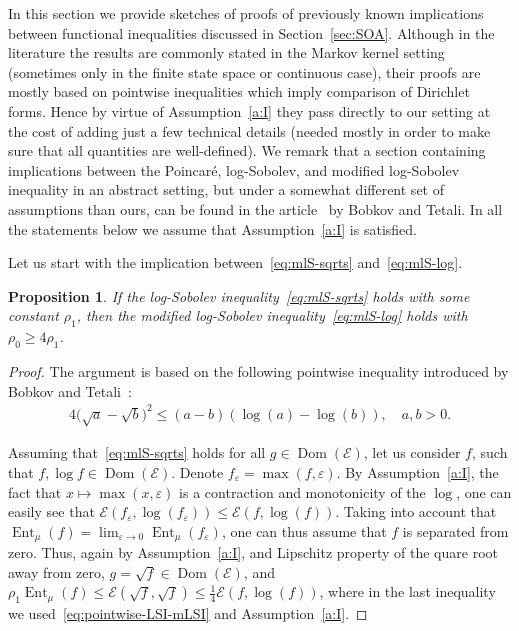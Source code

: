 \documentclass[a4paper]{amsart}
\newtheorem{proposition}[theorem]{Proposition} %
\theoremstyle{definition}
\theoremstyle{remark}
\numberwithin{equation}{section}
\DeclareMathOperator{\Dom}{Dom} %
\newcommand*{\calE}{\mathcal{E}}
\DeclareMathOperator{\Ent}{Ent}	%
\begin{document}
In this section we provide sketches of proofs of previously known implications between functional inequalities discussed in Section~\ref{sec:SOA}. Although in the literature the results are commonly stated in the Markov kernel setting (sometimes only in the finite state space or continuous case), their proofs are mostly based on pointwise inequalities which imply comparison of Dirichlet forms. Hence by virtue of Assumption~\ref{a:I} they pass directly to our setting at the cost of adding just a few technical details (needed mostly in order to make sure that all quantities are well-defined). We remark that a section containing implications between the Poincar\'e, log-Sobolev, and modified log-Sobolev inequality in an abstract setting, but under a somewhat different set of assumptions than ours, can be found in the article~\cite{MR2283379} by Bobkov and Tetali. In all the statements below we assume that Assumption~\ref{a:I} is satisfied.

Let us start with the implication between~\eqref{eq:mlS-sqrts} and~\eqref{eq:mlS-log}.
\begin{proposition}
\label{prop:LSI-to-mLSI}
If the log-Sobolev inequality~\eqref{eq:mlS-sqrts} holds with some constant $\rho_1$, then the modified log-Sobolev inequality~\eqref{eq:mlS-log} holds with $\rho_0 \ge 4\rho_1$.
\end{proposition}

\begin{proof}
The argument is based on the following pointwise inequality introduced by Bobkov and Tetali~\cite{MR2283379}:
\begin{align}\label{eq:pointwise-LSI-mLSI}
 4\bigl(\sqrt{a}-\sqrt{b}\bigr)^2 \leq (a-b)(\log(a)-\log(b)), \quad a,b>0.
\end{align}

Assuming that~\eqref{eq:mlS-sqrts} holds for all $g \in \Dom(\calE)$, let us consider $f$, such that $f, \log f \in \Dom(\calE)$. Denote $f_\varepsilon = \max(f,\varepsilon)$. By Assumption~\ref{a:I}, the fact that $x \mapsto \max(x,\varepsilon)$ is a contraction and monotonicity of the $\log$, one can easily see that $\calE(f_\varepsilon,\log(f_
\varepsilon)) \le \calE(f,\log(f))$. Taking into account that $\Ent_\mu(f) = \lim_{\varepsilon \to 0} \Ent_\mu(f_\varepsilon)$, one can thus assume that $f$ is separated from zero. Thus, again by Assumption~\ref{a:I}, and Lipschitz property of the quare root away from zero, $g = \sqrt{f} \in \Dom(\calE)$, and $\rho_1 \Ent_\mu(f) \le \calE(\sqrt{f},\sqrt{f}) \le \frac{1}{4}\calE(f,\log(f))$, where in the last inequality we used~\eqref{eq:pointwise-LSI-mLSI} and Assumption~\ref{a:I}.
\end{proof}
\end{document}
